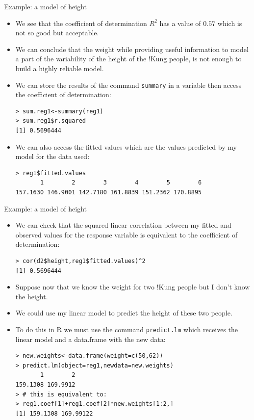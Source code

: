 \documentclass[handout]{beamer}
\begin{document}
\begin{frame}[fragile]{Example: a model of height}
\scriptsize{
\begin{itemize}
 \item We see that the coefficient of determination $R^2$ has a value of $0.57$ which is not so good but acceptable.
 
 
  \item We can conclude that the weight while providing useful information to model a part of the variability of the height of the !Kung people, is not enough to build a highly reliable model. 
  
  \item We can store the results of the command \verb+summary+ in a variable then access the coefficient of determination:
\begin{verbatim}
> sum.reg1<-summary(reg1)
> sum.reg1$r.squared
[1] 0.5696444  
\end{verbatim}

\item  We can also access the fitted values which are the values predicted by my model for the data used:
\begin{verbatim}
> reg1$fitted.values
       1        2        3        4        5        6      
157.1630 146.9001 142.7180 161.8839 151.2362 170.8895 
\end{verbatim}
 
 \end{itemize}
 

} 
\end{frame}



\begin{frame}[fragile]{Example: a model of height}
\scriptsize{
\begin{itemize}
 \item We can check that the squared linear correlation between my fitted and observed values for the response variable is equivalent to the coefficient of determination:
 
 \begin{verbatim}
> cor(d2$height,reg1$fitted.values)^2
[1] 0.5696444
 \end{verbatim}

\item  Suppose now that we know the weight for two !Kung people but I don't know the height.

\item  We could use my linear model to predict the height of these two people.

\item To do this in R we must use the command \verb+predict.lm+ which receives the linear model and a data.frame with the new data:
\begin{verbatim}
> new.weights<-data.frame(weight=c(50,62))
> predict.lm(object=reg1,newdata=new.weights)
       1        2 
159.1308 169.9912 
> # this is equivalent to:
> reg1.coef[1]+reg1.coef[2]*new.weights[1:2,]
[1] 159.1308 169.99122
\end{verbatim}

 
 \end{itemize}
 

} 
\end{frame}
\end{document}
